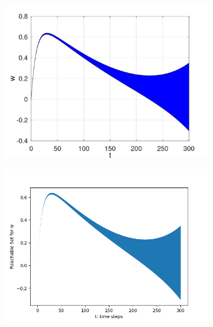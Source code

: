 \documentclass[EPiC]{easychair}
\begin{document}
\begin{figure}[h]
    \begin{subfigure}{0.45\textwidth}
    \centering
    \includegraphics[width=\textwidth]{SapoFigures/Quad/SapoQuad_W.jpg}
    \end{subfigure}
    \begin{subfigure}{0.47\textwidth}
    \centering
    \includegraphics[width=1.1\textwidth,height=0.8\textwidth]{SapoFigures/Quad/KaaQuad_W.png}
    \end{subfigure}
    

\end{figure}
\end{document}
